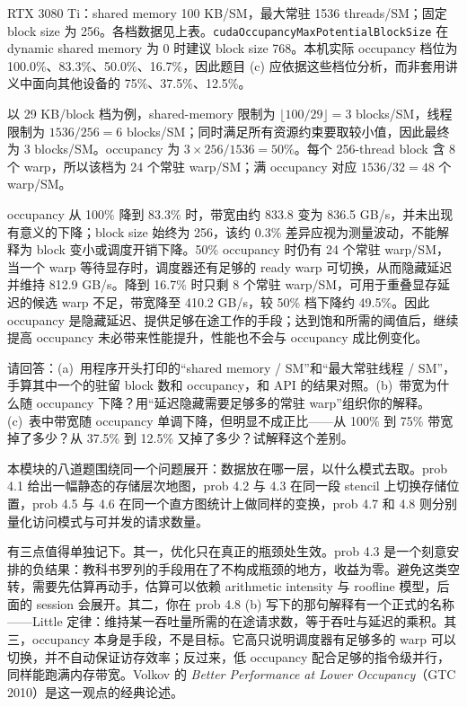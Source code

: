 \documentclass[11pt,a4paper,fontset=none]{ctexart}
\begin{document}
\begin{tcolorbox}[title={4.8 实验记录与分析}]
RTX 3080 Ti：shared memory 100 KB/SM，最大常驻 1536 threads/SM；固定 block size 为 256。各档数据见上表。\texttt{cudaOccupancyMaxPotentialBlockSize} 在 dynamic shared memory 为 0 时建议 block size 768。本机实际 occupancy 档位为 100.0\%、83.3\%、50.0\%、16.7\%，因此题目 (c) 应依据这些档位分析，而非套用讲义中面向其他设备的 75\%、37.5\%、12.5\%。

以 29 KB/block 档为例，shared-memory 限制为 $\lfloor100/29\rfloor=3$ blocks/SM，线程限制为 $1536/256=6$ blocks/SM；同时满足所有资源约束要取较小值，因此最终为 3 blocks/SM。occupancy 为 $3\times256/1536=50\%$。每个 256-thread block 含 8 个 warp，所以该档为 24 个常驻 warp/SM；满 occupancy 对应 $1536/32=48$ 个 warp/SM。

occupancy 从 100\% 降到 83.3\% 时，带宽由约 833.8 变为 836.5 GB/s，并未出现有意义的下降；block size 始终为 256，该约 0.3\% 差异应视为测量波动，不能解释为 block 变小或调度开销下降。50\% occupancy 时仍有 24 个常驻 warp/SM，当一个 warp 等待显存时，调度器还有足够的 ready warp 可切换，从而隐藏延迟并维持 812.9 GB/s。降到 16.7\% 时只剩 8 个常驻 warp/SM，可用于重叠显存延迟的候选 warp 不足，带宽降至 410.2 GB/s，较 50\% 档下降约 49.5\%。因此 occupancy 是隐藏延迟、提供足够在途工作的手段；达到饱和所需的阈值后，继续提高 occupancy 未必带来性能提升，性能也不会与 occupancy 成比例变化。
\end{tcolorbox}

请回答：(a)~用程序开头打印的“shared memory / SM”和“最大常驻线程 / SM”，手算其中一个的驻留 block 数和 occupancy，和 API 的结果对照。(b)~带宽为什么随 occupancy 下降？用“延迟隐藏需要足够多的常驻 warp”组织你的解释。(c)~表中带宽随 occupancy 单调下降，但明显不成正比——从 100\% 到 75\% 带宽掉了多少？从 37.5\% 到 12.5\% 又掉了多少？试解释这个差别。

\begin{lookback}
本模块的八道题围绕同一个问题展开：数据放在哪一层，以什么模式去取。prob 4.1 给出一幅静态的存储层次地图，prob 4.2 与 4.3 在同一段 stencil 上切换存储位置，prob 4.5 与 4.6 在同一个直方图统计上做同样的变换，prob 4.7 和 4.8 则分别量化访问模式与可并发的请求数量。

有三点值得单独记下。其一，优化只在真正的瓶颈处生效。prob 4.3 是一个刻意安排的负结果：教科书罗列的手段用在了不构成瓶颈的地方，收益为零。避免这类空转，需要先估算再动手，估算可以依赖 arithmetic intensity 与 roofline 模型，后面的 session 会展开。其二，你在 prob 4.8 (b) 写下的那句解释有一个正式的名称——Little 定律：维持某一吞吐量所需的在途请求数，等于吞吐与延迟的乘积。其三，occupancy 本身是手段，不是目标。它高只说明调度器有足够多的 warp 可以切换，并不自动保证访存效率；反过来，低 occupancy 配合足够的指令级并行，同样能跑满内存带宽。Volkov 的 \textit{Better Performance at Lower Occupancy}（GTC 2010）是这一观点的经典论述。
\end{lookback}
\end{document}

